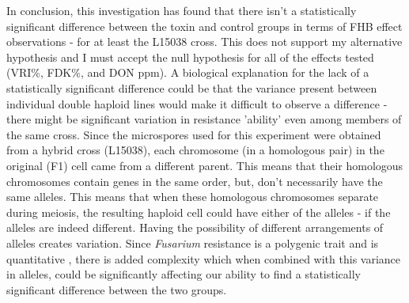 \documentclass[11pt]{article}
\begin{document}
In conclusion, this investigation has found that there isn't a statistically significant difference between the toxin and control groups in terms of FHB effect observations - for at least the L15038 cross. This does not support my alternative hypothesis and I must accept the null hypothesis for all of the effects tested (VRI\%, FDK\%, and DON ppm).
A biological explanation for the lack of a statistically significant difference could be that the variance present between individual double haploid lines would make it difficult to
observe a difference - there might be significant variation in resistance 'ability' even among members of the same cross. 
Since the microspores used for this experiment were obtained from a hybrid cross (L15038), each chromosome (in a homologous pair) in the original (F1) cell came from a different parent.  This means that their homologous chromosomes contain genes in the same order, but, don't necessarily have the same alleles.
This means that when these homologous chromosomes separate during meiosis, the resulting haploid cell could have either of the alleles - if the alleles are indeed different. Having the possibility of different arrangements of
alleles creates variation. Since \emph{Fusarium} resistance is a polygenic trait \cite{foroud2012differential} and is quantitative \cite{kumar2007identification}, there is added complexity which when combined with this variance in alleles, could be significantly affecting our ability to find a statistically significant difference between the two groups.     
\end{document}
